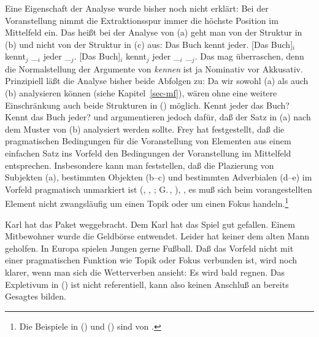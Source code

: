 Eine Eigenschaft der Analyse wurde bisher noch nicht erklärt: Bei der Voranstellung nimmt
die Extraktionsspur immer die höchste Position im Mittelfeld ein. Das heißt bei der Analyse
von (a) geht man von der Struktur in (b) und nicht von der Struktur in (c) aus:
\eal
\ex Das Buch kennt jeder.
\ex {}[Das Buch]$_i$ kennt$_j$ \_$_i$ jeder \_$_j$.
\ex {}[Das Buch]$_i$ kennt$_j$ jeder \_$_i$ \_$_j$.
\zl
Das mag überraschen, denn die Normalstellung der Argumente von \emph{kennen} ist ja Nominativ vor Akkusativ.
Prinzipiell läßt die Analyse bisher beide Abfolgen zu: Da wir sowohl (a) als auch (b)
analysieren können (siehe Kapitel~\ref{sec-mf}), wären ohne eine weitere Einschränkung
auch beide Strukturen in () möglich.%
\eal
\ex Kennt jeder das Buch?
\ex Kennt das Buch jeder?
\zl
\citet{Fanselow2003d} und \citet{Frey2004a} argumentieren jedoch dafür, daß der Satz in (a) nach dem
Muster von (b) analysiert werden sollte. Frey hat festgestellt, daß die pragmatischen
Bedingungen für die Voranstellung von Elementen aus einem einfachen Satz ins Vorfeld den Bedingungen der Voranstellung
im Mittelfeld entsprechen. Insbesondere kann man feststellen, daß die Plazierung von Subjekten (a), 
bestimmten Objekten (b--c) und bestimmten Adverbialen (d--e) im Vorfeld pragmatisch
unmarkiert 
ist (\citealp{Lenerz77}, \citealp[--74]{Haider84c}, \citealp{Fanselow2003d};
G.\,\citealp[]{GMueller2004a}, \citealp{Frey2004a}), 
\dash, es muß sich beim vorangestellten Element nicht zwangsläufig 
um einen Topik oder um einen Fokus handeln.\footnote{
  Die Beispiele in () und () sind von \citet{Frey2004a}. 
}

\eal
\label{bsp-voranstellung-pragmatik}
\ex Karl hat das Paket weggebracht.
\ex Dem Karl hat das Spiel gut gefallen.
\ex Einem Mitbewohner wurde die Geldbörse entwendet.
\ex Leider hat keiner dem alten Mann geholfen.
\ex In Europa spielen Jungen gerne Fußball.
\zl
Daß das Vorfeld nicht mit einer pragmatischen Funktion wie Topik oder Fokus verbunden ist,
wird noch klarer, wenn man sich die Wetterverben ansieht:
\ea
Es wird bald regnen.
\z
Das Expletivum in () ist nicht referentiell, kann also keinen Anschluß an bereits Gesagtes bilden.

